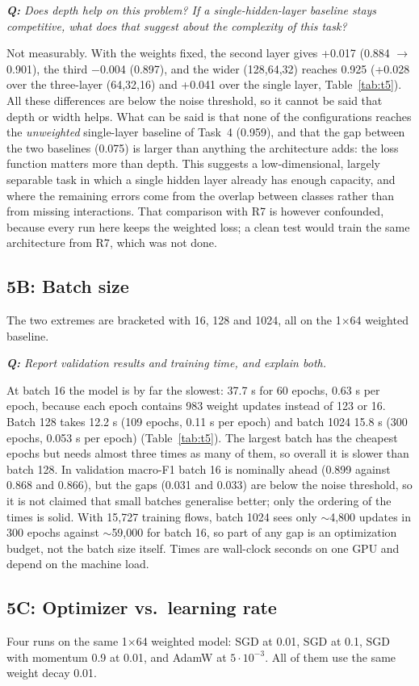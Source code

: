 \documentclass[9pt]{extarticle}
\newcommand{\qa}[1]{\par\vspace{2pt}\noindent\textit{\textbf{Q:} #1}\par\nopagebreak\noindent}
\newcommand{\run}[1]{\textsf{#1}}   %
\begin{document}
\qa{Does depth help on this problem? If a single-hidden-layer baseline stays competitive, what does
that suggest about the complexity of this task?}
Not measurably. With the weights fixed, the second layer gives +0.017 (0.884 $\to$ 0.901), the
third $-$0.004 (0.897), and the wider (128,64,32) reaches 0.925 (+0.028 over the three-layer
(64,32,16) and +0.041 over the single layer, Table~\ref{tab:t5}). All these differences are below the
noise threshold, so it cannot be said that depth or width helps. What can be said is that none of
the configurations reaches the \emph{unweighted} single-layer baseline of Task~4 (0.959), and that the gap
between the two baselines (0.075) is larger than anything the architecture adds: the loss function
matters more than depth. This suggests a low-dimensional, largely separable task in which a single
hidden layer already has enough capacity, and where the remaining errors come from the overlap
between classes rather than from missing interactions. That comparison with \run{R7} is however
confounded, because every run here keeps the weighted loss; a clean test would train the same
architecture from \run{R7}, which was not done.

\subsection{5B: Batch size}
The two extremes are bracketed with 16, 128 and 1024, all on the 1$\times$64 weighted baseline.

\qa{Report validation results and training time, and explain both.}
At batch 16 the model is by far the slowest: 37.7 s for 60 epochs, 0.63 s per epoch, because each
epoch contains 983 weight updates instead of 123 or 16. Batch 128 takes 12.2 s (109 epochs, 0.11 s
per epoch) and batch 1024 15.8 s (300 epochs, 0.053 s per epoch) (Table~\ref{tab:t5}). The largest
batch has the cheapest epochs but needs almost three times as many of them, so overall it is slower
than batch 128. In validation macro-F1 batch 16 is nominally ahead (0.899 against 0.868 and 0.866),
but the gaps (0.031 and 0.033) are below the noise threshold, so it is not claimed that small batches
generalise better; only the ordering of the times is solid. With 15,727 training flows, batch 1024
sees only $\sim$4,800 updates in 300 epochs against $\sim$59,000 for batch 16, so part of any gap is
an optimization budget, not the batch size itself. Times are wall-clock seconds on one GPU and
depend on the machine load.

\subsection{5C: Optimizer vs.\ learning rate}
Four runs on the same 1$\times$64 weighted model: SGD at 0.01, SGD at 0.1, SGD with momentum 0.9 at
0.01, and AdamW at $5\cdot10^{-3}$. All of them use the same weight decay 0.01.
\end{document}
